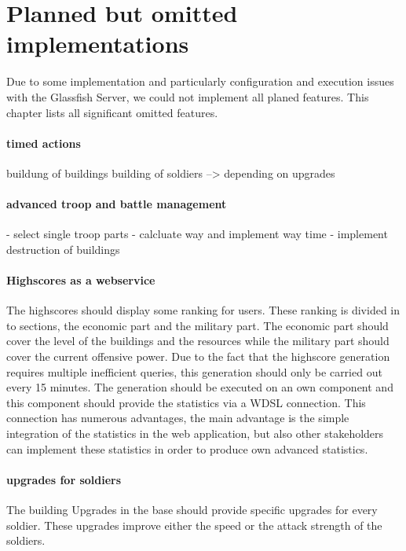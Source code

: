 \documentclass[a4paper]{article}
\begin{document}

\section{Planned but omitted implementations}
Due to some implementation and particularly configuration and execution issues with the Glassfish Server, we could not implement all planed features. This chapter lists all significant omitted features.

\paragraph{timed actions}
buildung of buildings
building of soldiers --> depending on upgrades



\paragraph{advanced troop and battle management}
- select single troop parts
- calcluate way and implement way time
- implement destruction of buildings

\paragraph{Highscores as a webservice}
The highscores should display some ranking for users. These ranking is divided in to sections, the economic part and the military part. The economic part should cover the level of the buildings and the resources while the military part should cover the current offensive power. Due to the fact that the highscore generation requires multiple inefficient queries, this generation should only be carried out every 15 minutes. The generation should be executed on an own component and this component should provide the statistics via a WDSL connection. This connection has numerous advantages, the main advantage is the simple integration of the statistics in the web application, but also other stakeholders can implement these statistics in order to produce own advanced statistics.

\paragraph{upgrades for soldiers}
The building Upgrades in the base should provide specific upgrades for every soldier. These upgrades improve either the speed or the attack strength of the soldiers.
\end{document}
